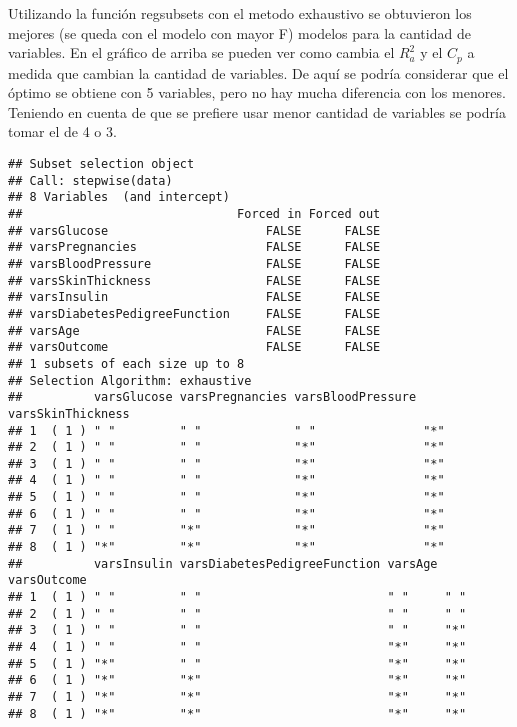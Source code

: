 \documentclass[
]{article}
\begin{document}
Utilizando la función regsubsets con el metodo exhaustivo se obtuvieron
los mejores (se queda con el modelo con mayor F) modelos para la
cantidad de variables. En el gráfico de arriba se pueden ver como cambia
el \(R_{a}^{2}\) y el \(C_p\) a medida que cambian la cantidad de
variables. De aquí se podría considerar que el óptimo se obtiene con 5
variables, pero no hay mucha diferencia con los menores. Teniendo en
cuenta de que se prefiere usar menor cantidad de variables se podría
tomar el de 4 o 3.

\begin{verbatim}
## Subset selection object
## Call: stepwise(data)
## 8 Variables  (and intercept)
##                              Forced in Forced out
## varsGlucose                      FALSE      FALSE
## varsPregnancies                  FALSE      FALSE
## varsBloodPressure                FALSE      FALSE
## varsSkinThickness                FALSE      FALSE
## varsInsulin                      FALSE      FALSE
## varsDiabetesPedigreeFunction     FALSE      FALSE
## varsAge                          FALSE      FALSE
## varsOutcome                      FALSE      FALSE
## 1 subsets of each size up to 8
## Selection Algorithm: exhaustive
##          varsGlucose varsPregnancies varsBloodPressure varsSkinThickness
## 1  ( 1 ) " "         " "             " "               "*"              
## 2  ( 1 ) " "         " "             "*"               "*"              
## 3  ( 1 ) " "         " "             "*"               "*"              
## 4  ( 1 ) " "         " "             "*"               "*"              
## 5  ( 1 ) " "         " "             "*"               "*"              
## 6  ( 1 ) " "         " "             "*"               "*"              
## 7  ( 1 ) " "         "*"             "*"               "*"              
## 8  ( 1 ) "*"         "*"             "*"               "*"              
##          varsInsulin varsDiabetesPedigreeFunction varsAge varsOutcome
## 1  ( 1 ) " "         " "                          " "     " "        
## 2  ( 1 ) " "         " "                          " "     " "        
## 3  ( 1 ) " "         " "                          " "     "*"        
## 4  ( 1 ) " "         " "                          "*"     "*"        
## 5  ( 1 ) "*"         " "                          "*"     "*"        
## 6  ( 1 ) "*"         "*"                          "*"     "*"        
## 7  ( 1 ) "*"         "*"                          "*"     "*"        
## 8  ( 1 ) "*"         "*"                          "*"     "*"
\end{verbatim}
\end{document}

